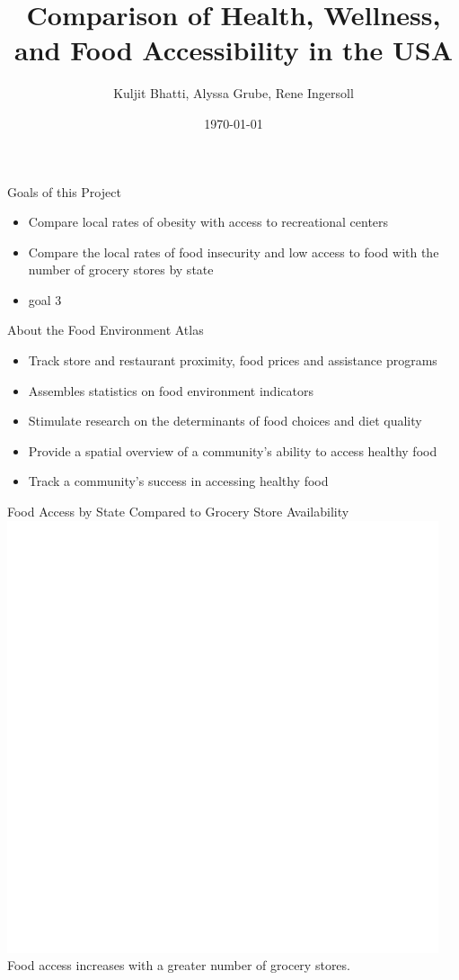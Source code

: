 \documentclass{beamer} %
\title[Comparison of Health, Wellness, and Food Accessibility in the USA ]{Comparison of Health, Wellness, and Food Accessibility in the USA }
\institute[UNL]{University of Nebraska-Lincoln}
\author{Kuljit Bhatti, Alyssa Grube, Rene Ingersoll}
\date{\today}
\begin{document}
	
	\begin{frame}
		\titlepage
	\end{frame}
	
	
	
	\begin{frame}{Goals of this Project}
		\begin{itemize}
			\item Compare local rates of obesity with access to recreational centers  
			\item Compare the local rates of food insecurity and low access to food with the number of grocery stores by state  
			\item goal 3 
		\end{itemize}
	\end{frame}
	
	
	\begin{frame}{About the Food Environment Atlas} 
		\begin{itemize}
			\item Track store and restaurant proximity, food prices and assistance programs 
			\item Assembles statistics on food environment indicators 
			\item Stimulate research on the determinants of food choices and diet quality 
			\item Provide a spatial overview of a community's ability to access healthy food 
			\item Track a community's success in accessing healthy food 
		\end{itemize}
	\end{frame}

\begin{frame}{Food Access by State Compared to Grocery Store Availability}
	\includegraphics{grocplot} 
	Food access increases with a greater number of grocery stores. 
	\end{frame}
	
\end{document}
